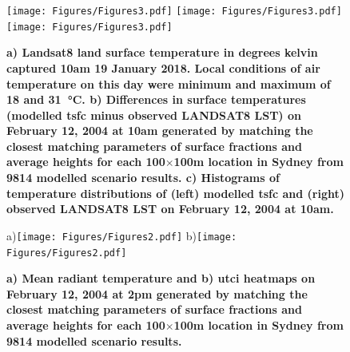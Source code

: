 \documentclass[final,3p,times,authoryear]{elsarticle}
\begin{document}
\begin{figure}  
\centering
\texttt{[image: Figures/Figures3.pdf]}
\texttt{[image: Figures/Figures3.pdf]}
\texttt{[image: Figures/Figures3.pdf]}
\caption{\bf a) Landsat8 land surface temperature in degrees kelvin captured 10am 19 January 2018. Local conditions of air temperature on this day were minimum and maximum of 18 and 31\SI{}{\degreeCelsius}. b) Differences in surface temperatures (modelled \gls{tsfc} minus observed LANDSAT8 LST) on February 12, 2004 at 10am generated by matching the closest matching parameters of surface fractions and average heights for each 100$\times$100m location in Sydney from 9814 modelled scenario results. c) Histograms of temperature distributions of (left) modelled \gls{tsfc} and (right) observed LANDSAT8 LST on February 12, 2004 at 10am. }
 \label{fig:Sydney-Landsat-LST-19-01-2018}
 \label{fig:Sydney-Landsat-TSFC-LST-19-01-2018}
 \label{fig:Sydney_TSFC14_85}
\end{figure}



\begin{figure}
\centering
a)\texttt{[image: Figures/Figures2.pdf]}
b)\texttt{[image: Figures/Figures2.pdf]}
\caption{\bf a) Mean radiant temperature and b) \gls{utci}  heatmaps on February 12, 2004 at 2pm generated by matching the closest matching parameters of surface fractions and average heights for each 100$\times$100m location in Sydney from 9814 modelled scenario results.  }
 \label{fig:utciSyd}\label{fig:TmrtSyd}
\end{figure}
\end{document}
